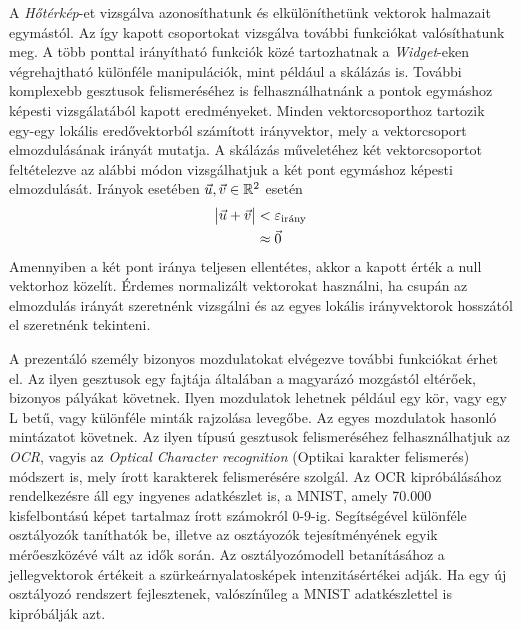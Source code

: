 
A \textit{Hőtérkép}-et vizsgálva azonosíthatunk és elkülöníthetünk vektorok halmazait egymástól. Az így kapott csoportokat vizsgálva további funkciókat valósíthatunk meg. A több ponttal irányítható funkciók közé tartozhatnak a \textit{Widget}-eken végrehajtható különféle manipulációk, mint például a skálázás is. További komplexebb gesztusok felismeréséhez is felhasználhatnánk a pontok egymáshoz képesti vizsgálatából kapott eredményeket.
Minden vektorcsoporthoz tartozik egy-egy lokális eredővektorból számított irányvektor, mely a vektorcsoport elmozdulásának irányát mutatja.
A skálázás műveletéhez két vektorcsoportot feltételezve az alábbi módon vizsgálhatjuk a két pont egymáshoz képesti elmozdulását.
Irányok esetében $\vec{u},\vec{v}\in \Bbb R^2$ esetén
\begin{align*}
\vmatrix \vec{u}+\vec{v} \endvmatrix &< \varepsilon_{\text{irány}}\\
&\approx \vec{0}
\end{align*}
Amennyiben a két pont iránya teljesen ellentétes, akkor a kapott érték a null vektorhoz közelít. Érdemes normalizált vektorokat használni, ha csupán az elmozdulás irányát szeretnénk vizsgálni és az egyes lokális irányvektorok hosszától el szeretnénk tekinteni.


A prezentáló személy bizonyos mozdulatokat elvégezve további funkciókat érhet el. Az ilyen gesztusok egy fajtája általában a magyarázó mozgástól eltérőek, bizonyos pályákat követnek. Ilyen mozdulatok lehetnek például egy kör, vagy egy L betű, vagy különféle minták rajzolása levegőbe. Az egyes mozdulatok hasonló mintázatot követnek.
Az ilyen típusú gesztusok felismeréséhez felhasználhatjuk az \textit{OCR}, vagyis az \textit{Optical Character recognition} (Optikai karakter felismerés) módszert is, mely írott karakterek felismerésére szolgál. 
Az OCR kipróbálásához rendelkezésre áll egy ingyenes adatkészlet is, a MNIST, amely 70.000 kisfelbontású képet tartalmaz írott számokról 0-9-ig. Segítségével különféle osztályozók taníthatók be, illetve az osztáyozók tejesítményének egyik mérőeszközévé vált az idők során. Az osztályozómodell betanításához a jellegvektorok értékeit a szürkeárnyalatosképek intenzitásértékei adják. Ha egy új osztályozó rendszert fejlesztenek, valószínűleg a MNIST adatkészlettel is kipróbálják azt. \cite{geron2019hands}

